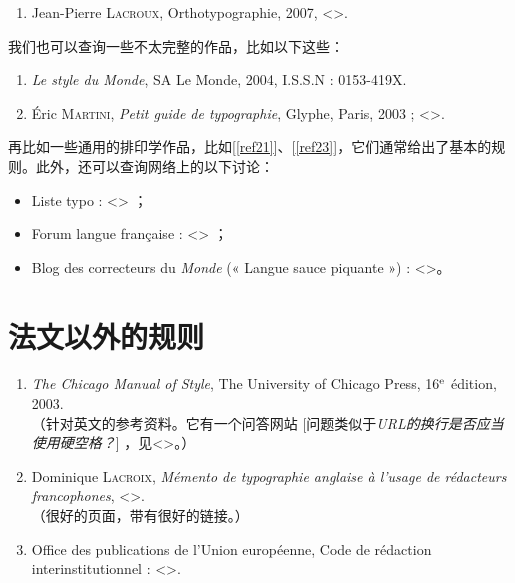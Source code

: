 \begin{enumerate}[resume]
    \item Jean-Pierre \textsc{Lacroux}, Orthotypographie, 2007, <>. \label{ref5}
\end{enumerate}

我们也可以查询一些不太完整的作品，比如以下这些：

\begin{enumerate}[resume]
    \item \emph{Le style du Monde}, SA Le Monde, 2004, I.S.S.N : 0153-419X. \label{ref6}
    \item Éric \textsc{Martini}, \emph{Petit guide de typographie}, Glyphe, Paris, 2003 ; <>. \label{ref7}
\end{enumerate}

再比如一些通用的排印学作品，比如[\ref{ref21}]、[\ref{ref23}]，它们通常给出了基本的规则。此外，还可以查询网络上的以下讨论：

\begin{itemize}
    \item Liste typo : <> ；
    \item Forum langue française : <> ；
    \item Blog des correcteurs du \emph{Monde} (« Langue sauce piquante ») :
    <>。
\end{itemize}

\section{法文以外的规则}

\begin{enumerate}[resume]
    \item \emph{The Chicago Manual of Style}, The University of Chicago Press, 16$^{\rm e}$ édition, 2003.\\
    （针对英文的参考资料。它有一个问答网站 [问题类似于\emph{URL的换行是否应当使用硬空格？}] ，见<>。）\label{ref8}
    \item Dominique \textsc{Lacroix}, \emph{Mémento de typographie anglaise à l'usage de rédacteurs francophones}, <>.\\
    （很好的页面，带有很好的链接。）\label{ref9}
    \item Office des publications de l'Union européenne, Code de rédaction interinstitutionnel : <>.\label{ref10}
\end{enumerate}


